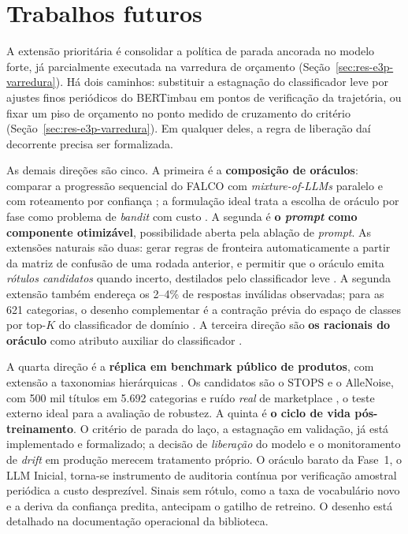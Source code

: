 \section{Trabalhos futuros}
\label{sec:conc-futuro}

A extensão prioritária é consolidar a política de parada ancorada no modelo
forte, já parcialmente executada na varredura de orçamento
(Seção~\ref{sec:res-e3p-varredura}). Há dois caminhos: substituir a
estagnação do classificador leve por ajustes finos periódicos do BERTimbau em
pontos de verificação da trajetória, ou fixar um piso de orçamento no ponto
medido de cruzamento do critério (Seção~\ref{sec:res-e3p-varredura}). Em
qualquer deles, a regra de liberação daí decorrente precisa ser formalizada.

As demais direções são cinco. A primeira é a \textbf{composição de
oráculos}: comparar a progressão sequencial do FALCO com
\textit{mixture-of-LLMs} paralelo \citep{Qi2026MixtureLLMs} e com roteamento
por confiança \citep{Rouzegar2024}; a formulação ideal trata a escolha de
oráculo por fase como problema de \textit{bandit} com custo
\citep{BlumMansour2007,Baykal2021}. A segunda é \textbf{o \textit{prompt}
como componente otimizável}, possibilidade aberta pela ablação de
\textit{prompt}. As
extensões naturais são duas: gerar regras de fronteira automaticamente a
partir da matriz de confusão de uma rodada anterior, e permitir que o
oráculo emita \emph{rótulos candidatos} quando incerto, destilados pelo
classificador leve \citep{Xia2025CanDist}. A segunda extensão também
endereça os 2--4\% de respostas inválidas observadas; para as 621
categorias, o desenho complementar é a contração prévia do espaço de classes
por top-$K$ do classificador de domínio \citep{Cheng2024DualExpert}. A
terceira direção são \textbf{os racionais do oráculo} como atributo auxiliar
do classificador \citep{Sharma2015}.

A quarta direção é a \textbf{réplica em benchmark público de produtos}, com
extensão a taxonomias hierárquicas \citep{Sun2003,Tan2020}. Os candidatos
são o STOPS \citep{Karl2023} e o AlleNoise, com 500 mil títulos em 5.692
categorias e ruído \emph{real} de marketplace
\citep{Raczkowska2024AlleNoise}, o teste externo ideal para a avaliação de
robustez. A quinta é \textbf{o ciclo de vida pós-treinamento}. O critério de
parada do laço, a estagnação em validação, já está implementado e
formalizado; a decisão de \emph{liberação} do modelo e o monitoramento de
\textit{drift} em produção merecem tratamento próprio. O oráculo barato da
Fase~1, o LLM Inicial, torna-se instrumento de auditoria contínua por
verificação amostral periódica a custo desprezível. Sinais sem rótulo, como
a taxa de vocabulário novo e a deriva da confiança predita, antecipam o
gatilho de retreino. O desenho está detalhado na documentação operacional da
biblioteca.

